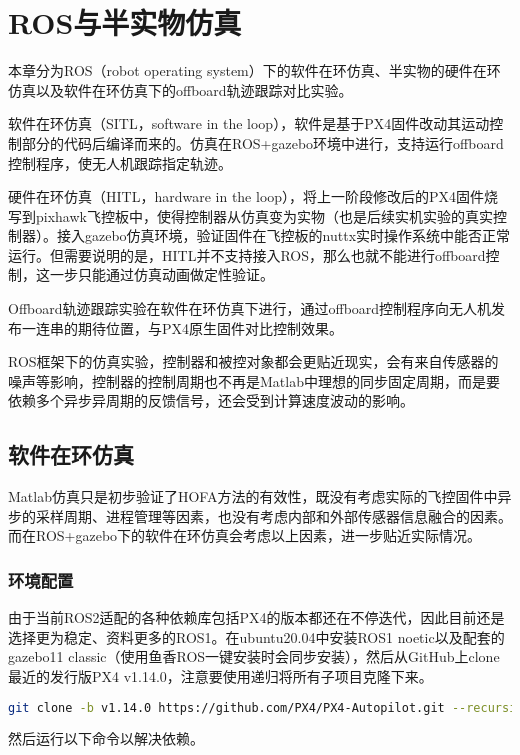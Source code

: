 \chapter{ROS与半实物仿真}
本章分为ROS（robot operating system）下的软件在环仿真、半实物的硬件在环仿真以及软件在环仿真下的offboard轨迹跟踪对比实验。

软件在环仿真（SITL，software in the loop），软件是基于PX4固件改动其运动控制部分的代码后编译而来的。仿真在ROS+gazebo环境中进行，支持运行offboard控制程序，使无人机跟踪指定轨迹。

硬件在环仿真（HITL，hardware in the loop），将上一阶段修改后的PX4固件烧写到pixhawk飞控板中，使得控制器从仿真变为实物（也是后续实机实验的真实控制器）。接入gazebo仿真环境，验证固件在飞控板的nuttx实时操作系统中能否正常运行。但需要说明的是，HITL并不支持接入ROS，那么也就不能进行offboard控制，这一步只能通过仿真动画做定性验证。

Offboard轨迹跟踪实验在软件在环仿真下进行，通过offboard控制程序向无人机发布一连串的期待位置，与PX4原生固件对比控制效果。

ROS框架下的仿真实验，控制器和被控对象都会更贴近现实，会有来自传感器的噪声等影响，控制器的控制周期也不再是Matlab中理想的同步固定周期，而是要依赖多个异步异周期的反馈信号，还会受到计算速度波动的影响。

\section{软件在环仿真}
Matlab仿真只是初步验证了HOFA方法的有效性，既没有考虑实际的飞控固件中异步的采样周期、进程管理等因素，也没有考虑内部和外部传感器信息融合的因素。而在ROS+gazebo下的软件在环仿真会考虑以上因素，进一步贴近实际情况。

\subsection{环境配置}
由于当前ROS2适配的各种依赖库包括PX4的版本都还在不停迭代，因此目前还是选择更为稳定、资料更多的ROS1。在ubuntu20.04中安装ROS1 noetic以及配套的gazebo11 classic（使用鱼香ROS一键安装\cite{fishros}时会同步安装），然后从GitHub上clone最近的发行版PX4 v1.14.0，注意要使用递归将所有子项目克隆下来。
\begin{lstlisting}[language=Bash, basicstyle=\footnotesize, linewidth=\linewidth]
  git clone -b v1.14.0 https://github.com/PX4/PX4-Autopilot.git --recursive
\end{lstlisting}

然后运行以下命令以解决依赖。

